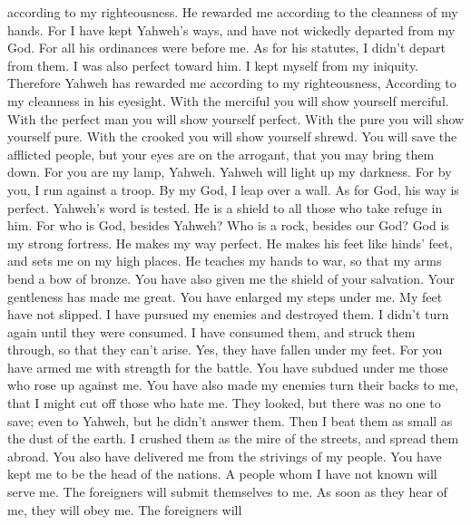 \begin{paracol}{2}
\begin{otherlanguage}{english}
according to my righteousness. He rewarded me according to the cleanness
of my hands.  For I have kept Yahweh's ways, and have not
wickedly departed from my God.  For all his ordinances
were before me. As for his statutes, I didn't depart from them.
 I was also perfect toward him. I kept myself from my
iniquity.  Therefore Yahweh has rewarded me according to
my righteousness, According to my cleanness in his eyesight.
 With the merciful you will show yourself merciful. With
the perfect man you will show yourself perfect.  With the
pure you will show yourself pure. With the crooked you will show
yourself shrewd.  You will save the afflicted people, but
your eyes are on the arrogant, that you may bring them down.
 For you are my lamp, Yahweh. Yahweh will light up my
darkness.  For by you, I run against a troop. By my God,
I leap over a wall.  As for God, his way is perfect.
Yahweh's word is tested. He is a shield to all those who take refuge in
him.  For who is God, besides Yahweh? Who is a rock,
besides our God?  God is my strong fortress. He makes my
way perfect.  He makes his feet like hinds' feet, and
sets me on my high places.  He teaches my hands to war,
so that my arms bend a bow of bronze.  You have also
given me the shield of your salvation. Your gentleness has made me
great.  You have enlarged my steps under me. My feet have
not slipped.  I have pursued my enemies and destroyed
them. I didn't turn again until they were consumed.  I
have consumed them, and struck them through, so that they can't arise.
Yes, they have fallen under my feet.  For you have armed
me with strength for the battle. You have subdued under me those who
rose up against me.  You have also made my enemies turn
their backs to me, that I might cut off those who hate me.
 They looked, but there was no one to save; even to
Yahweh, but he didn't answer them.  Then I beat them as
small as the dust of the earth. I crushed them as the mire of the
streets, and spread them abroad.  You also have delivered
me from the strivings of my people. You have kept me to be the head of
the nations. A people whom I have not known will serve me.
 The foreigners will submit themselves to me. As soon as
they hear of me, they will obey me.  The foreigners will

\end{otherlanguage}
\end{paracol}

